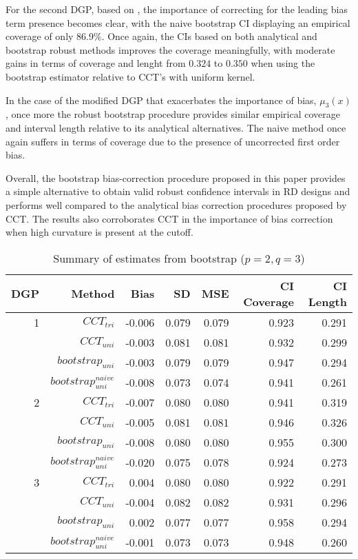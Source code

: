 \documentclass[12pt,fleqn]{article}
\begin{document}
For the second DGP, based on \cite{ludwig2007}, the importance of correcting for the leading bias term presence becomes clear, with the naive bootstrap CI displaying an empirical coverage of only 86.9\%. Once again, the CIs based on both analytical and bootstrap robust methods improves the coverage meaningfully, with moderate gains in terms of coverage and lenght from $0.324$ to $0.350$ when using the bootstrap estimator relative to CCT's with uniform kernel.

In the case of the modified \cite{lee2008rand} DGP that exacerbates the importance of bias, $\mu_{3}(x)$, once more the robust bootstrap procedure provides similar empirical coverage and interval length relative to its analytical alternatives. The naive method once again suffers in terms of coverage due to the presence of uncorrected first order bias.

 Overall, the bootstrap bias-correction procedure proposed in this paper provides a simple alternative to obtain valid robust confidence intervals in RD designs and performs well compared to the analytical
bias correction procedures proposed by CCT. The results also corroborates CCT in the importance of bias correction when high curvature is present at the cutoff. 

\begin{table}[t]
\centering
\begin{tabular}{rrrrrrr}
  \toprule
  DGP & Method    & Bias    & SD    & MSE   & CI Coverage & CI Length \\
  \midrule
    1 & $CCT_{tri}$ & -0.006 & 0.079 & 0.079 & 0.923 & 0.291 \\ 
      & $CCT_{uni}$ & -0.003 & 0.081 & 0.081 & 0.932 & 0.299 \\ 
      & $bootstrap_{uni}$       & -0.003 & 0.079 & 0.079 & 0.947 & 0.294 \\ 
      & $bootstrap_{uni}^{naive}$ & -0.008 & 0.073 & 0.074 & 0.941 & 0.261 \\ 
     \midrule
    2 & $CCT_{tri}$ & -0.007 & 0.080 & 0.080 & 0.941 & 0.319 \\ 
      & $CCT_{uni}$ & -0.005 & 0.081 & 0.081 & 0.946 & 0.326 \\ 
      & $bootstrap_{uni}$       & -0.008 & 0.080 & 0.080 & 0.955 & 0.300 \\ 
      & $bootstrap_{uni}^{naive}$ & -0.020 & 0.075 & 0.078 & 0.924 & 0.273 \\ 
     \midrule
    3 & $CCT_{tri}$ & 0.004 & 0.080 & 0.080 & 0.922 & 0.291 \\ 
      & $CCT_{uni}$ & -0.004 & 0.082 & 0.082 & 0.931 & 0.296 \\ 
      & $bootstrap_{uni}$       & 0.002 & 0.077 & 0.077 & 0.958 & 0.294 \\ 
      & $bootstrap_{uni}^{naive}$ & -0.001 & 0.073 & 0.073 & 0.948 & 0.260 \\ 
  \bottomrule
\end{tabular}
\caption{Summary of estimates from bootstrap ($p = 2, q = 3$)}
\label{Tb: simulation 2}
\end{table}
\end{document}
